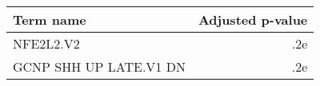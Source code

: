 \begin{tabular}{lr}
\toprule
             Term name &  Adjusted p-value \\
\midrule
             NFE2L2.V2 &               .2e \\
GCNP SHH UP LATE.V1 DN &               .2e \\
\bottomrule
\end{tabular}
